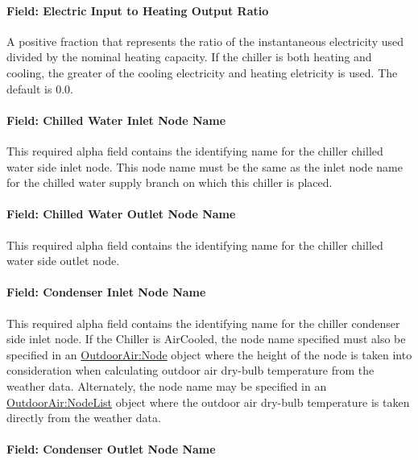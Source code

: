 \paragraph{Field: Electric Input to Heating Output Ratio}\label{field-electric-input-to-heating-output-ratio-1}

A positive fraction that represents the ratio of the instantaneous electricity used divided by the nominal heating capacity. If the chiller is both heating and cooling, the greater of the cooling electricity and heating eletricity is used. The default is 0.0.

\paragraph{Field: Chilled Water Inlet Node Name}\label{field-chilled-water-inlet-node-name-8}

This required alpha field contains the identifying name for the chiller chilled water side inlet node. This node name must be the same as the inlet node name for the chilled water supply branch on which this chiller is placed.

\paragraph{Field: Chilled Water Outlet Node Name}\label{field-chilled-water-outlet-node-name-9}

This required alpha field contains the identifying name for the chiller chilled water side outlet node.

\paragraph{Field: Condenser Inlet Node Name}\label{field-condenser-inlet-node-name-8}

This required alpha field contains the identifying name for the chiller condenser side inlet node. If the Chiller is AirCooled, the node name specified must also be specified in an \hyperref[outdoorairnode]{OutdoorAir:Node} object where the height of the node is taken into consideration when calculating outdoor air dry-bulb temperature from the weather data. Alternately, the node name may be specified in an \hyperref[outdoorairnodelist]{OutdoorAir:NodeList} object where the outdoor air dry-bulb temperature is taken directly from the weather data.

\paragraph{Field: Condenser Outlet Node Name}\label{field-condenser-outlet-node-name-8}

